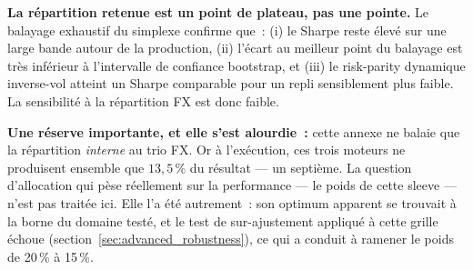 \begin{insightbox}
\textbf{La répartition retenue est un point de plateau, pas une pointe.} Le balayage exhaustif du simplexe confirme que~: (i) le Sharpe reste élevé sur une large bande autour de la production, (ii) l'écart au meilleur point du balayage est très inférieur à l'intervalle de confiance bootstrap, et (iii) le risk-parity dynamique inverse-vol atteint un Sharpe comparable pour un repli sensiblement plus faible. La sensibilité à la répartition FX est donc faible.

\textbf{Une réserve importante, et elle s'est alourdie~:} cette annexe ne balaie que la répartition \emph{interne} au trio FX. Or à l'exécution, ces trois moteurs ne produisent ensemble que $13{,}5\,\%$ du résultat --- un septième. La question d'allocation qui pèse réellement sur la performance --- le poids de cette sleeve --- n'est pas traitée ici. Elle l'a été autrement~: son optimum apparent se trouvait à la borne du domaine testé, et le test de sur-ajustement appliqué à cette grille échoue (section~\ref{sec:advanced_robustness}), ce qui a conduit à ramener le poids de 20\,\% à 15\,\%.
\end{insightbox}
